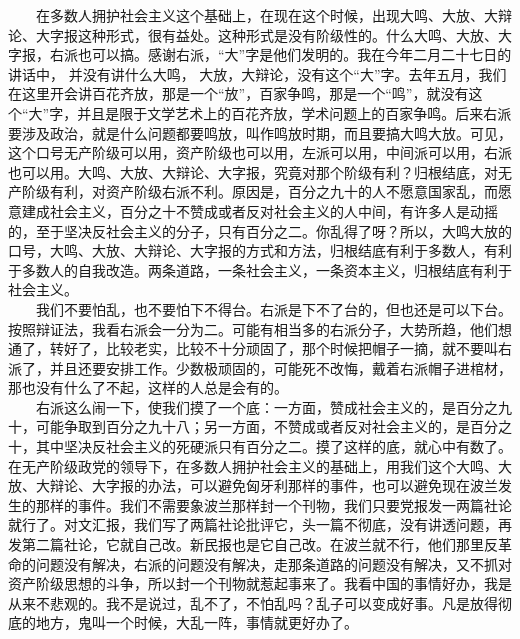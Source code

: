 \documentclass[cn,11pt,chinese]{elegantbook}
\begin{document}
　　在多数人拥护社会主义这个基础上，在现在这个时候，出现大鸣、大放、大辩论、大字报这种形式，很有益处。这种形式是没有阶级性的。什么大鸣、大放、大字报，右派也可以搞。感谢右派，“大”字是他们发明的。我在今年二月二十七日的讲话中， 并没有讲什么大鸣， 大放，大辩论，没有这个“大”字。去年五月，我们在这里开会讲百花齐放，那是一个“放”，百家争鸣，那是一个“鸣”，就没有这个“大”字，并且是限于文学艺术上的百花齐放，学术问题上的百家争鸣。后来右派要涉及政治，就是什么问题都要鸣放，叫作鸣放时期，而且要搞大鸣大放。可见，这个口号无产阶级可以用，资产阶级也可以用，左派可以用，中间派可以用，右派也可以用。大鸣、大放、大辩论、大字报，究竟对那个阶级有利？归根结底，对无产阶级有利，对资产阶级右派不利。原因是，百分之九十的人不愿意国家乱，而愿意建成社会主义，百分之十不赞成或者反对社会主义的人中间，有许多人是动摇的，至于坚决反社会主义的分子，只有百分之二。你乱得了呀？所以，大鸣大放的口号，大鸣、大放、大辩论、大字报的方式和方法，归根结底有利于多数人，有利于多数人的自我改造。两条道路，一条社会主义，一条资本主义，归根结底有利于社会主义。\\
　　我们不要怕乱，也不要怕下不得台。右派是下不了台的，但也还是可以下台。按照辩证法，我看右派会一分为二。可能有相当多的右派分子，大势所趋，他们想通了，转好了，比较老实，比较不十分顽固了，那个时候把帽子一摘，就不要叫右派了，并且还要安排工作。少数极顽固的，可能死不改悔，戴着右派帽子进棺材，那也没有什么了不起，这样的人总是会有的。\\
　　右派这么闹一下，使我们摸了一个底：一方面，赞成社会主义的，是百分之九十，可能争取到百分之九十八；另一方面，不赞成或者反对社会主义的，是百分之十，其中坚决反社会主义的死硬派只有百分之二。摸了这样的底，就心中有数了。在无产阶级政党的领导下，在多数人拥护社会主义的基础上，用我们这个大鸣、大放、大辩论、大字报的办法，可以避免匈牙利那样的事件，也可以避免现在波兰发生的那样的事件。我们不需要象波兰那样封一个刊物，我们只要党报发一两篇社论就行了。对文汇报，我们写了两篇社论批评它，头一篇不彻底，没有讲透问题，再发第二篇社论，它就自己改。新民报也是它自己改。在波兰就不行，他们那里反革命的问题没有解决，右派的问题没有解决，走那条道路的问题没有解决，又不抓对资产阶级思想的斗争，所以封一个刊物就惹起事来了。我看中国的事情好办，我是从来不悲观的。我不是说过，乱不了，不怕乱吗？乱子可以变成好事。凡是放得彻底的地方，鬼叫一个时候，大乱一阵，事情就更好办了。\\
\end{document}
